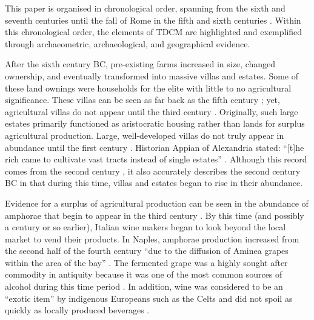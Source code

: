 This paper is organised in chronological order, spanning from the sixth and seventh centuries \BC until the fall of Rome in the fifth and sixth centuries \AD. Within this chronological order, the elements of TDCM are highlighted and exemplified through archaeometric, archaeological, and geographical evidence.


After  the sixth century BC, pre-existing farms increased in size, changed ownership, and eventually transformed into massive villas and estates. Some of these land ownings were households for the elite with little to no agricultural significance. These villas can be seen as far back as the fifth century \BC; yet, agricultural villas do not appear until the third century \BC \parencite[18]{Terrenato_2001}. Originally, such large estates primarily functioned as aristocratic housing rather than lands for surplus agricultural production. Large, well-developed villas do not truly appear in abundance until the first century \BC \parencite[24]{Terrenato_2001}. Historian Appian of Alexandria stated: “[t]he rich came to cultivate vast tracts instead of single estates” \parencite[98]{Potter_1990}. Although this record comes from the second century \AD, it also accurately describes the second century BC in that during this time, villas and estates began to rise in their abundance.

Evidence for a surplus of agricultural production can be seen in the abundance of amphorae that begin to appear in the third century \BC. By this time (and possibly a century or so earlier), Italian wine makers began to look beyond the local market to vend their products. In Naples, amphorae production increased from the second half of the fourth century \BC “due to the diffusion of Aminea grapes within the area of the bay” \parencite[61]{Olcese_2005}. The fermented grape was a highly sought after commodity in antiquity because it was one of the most common sources of alcohol during this time period \parencite[2]{Purcell_1985}. In addition, wine was considered to be an “exotic item” by indigenous Europeans such as the Celts and did not spoil as quickly as locally produced beverages \parencite[383]{Dietler_1990}. 

